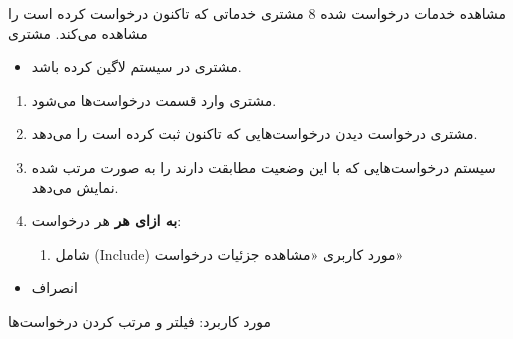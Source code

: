 {
\usecase
{مشاهده خدمات درخواست شده}
{8}
{مشتری خدماتی که تاکنون درخواست کرده است را مشاهده می‌کند.}
{مشتری}
{}
{	
	\begin{itemize}
		\vspace*{-0.6cm}
		\item 
		مشتری در سیستم لاگین کرده باشد.
	\end{itemize}
}
{
	\vspace*{-0.6cm}
	\begin{enumerate}
		\item 
		مشتری وارد قسمت درخواست‌ها می‌شود.
		\item
		مشتری درخواست دیدن درخواست‌هایی که تاکنون ثبت کرده است را می‌دهد.
		\item
		سیستم درخواست‌هایی که با این وضعیت مطابقت دارند را به صورت مرتب شده نمایش می‌دهد.
		
		\item
		\textbf{به ازای هر} هر درخواست:
		
		\begin{enumerate}[label=\theenumi.\arabic*.]
			\item
			شامل (Include) مورد کاربری «مشاهده جزئیات درخواست»
		\end{enumerate}
	\end{enumerate}
}
{}
{
	\begin{itemize}
		\item
		انصراف
	\end{itemize}
}
{
	مورد کاربرد: فیلتر و مرتب کردن درخواست‌ها
}

}


